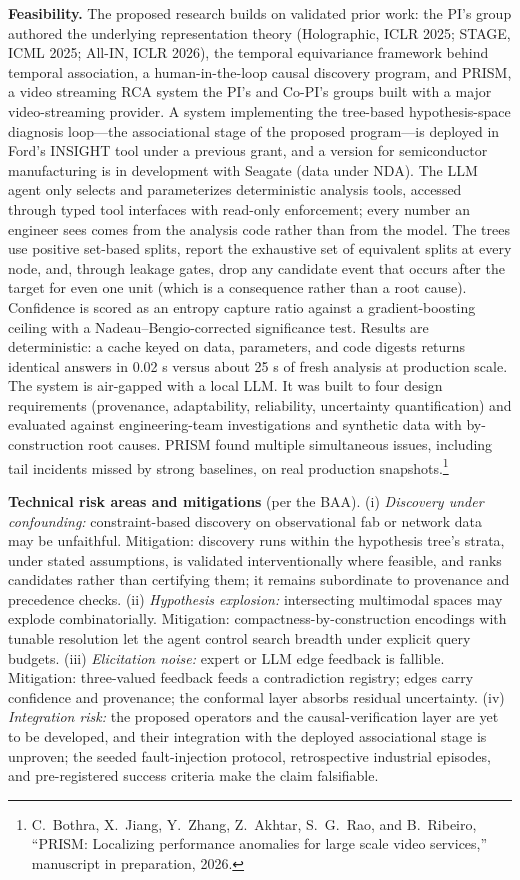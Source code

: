 \documentclass[12pt]{article}
\begin{document}
\textbf{Feasibility.} The proposed research builds on validated prior work: the PI's group authored the underlying representation theory (Holographic, ICLR 2025; STAGE, ICML 2025; All-IN, ICLR 2026), the temporal equivariance framework behind temporal association, a human-in-the-loop causal discovery program, and PRISM, a video streaming RCA system the PI's and Co-PI's groups built with a major video-streaming provider. A system implementing the tree-based hypothesis-space diagnosis loop---the associational stage of the proposed program---is deployed in Ford's INSIGHT tool under a previous grant, and a version for semiconductor manufacturing is in development with Seagate (data under NDA). The LLM agent only selects and parameterizes deterministic analysis tools, accessed through typed tool interfaces with read-only enforcement; every number an engineer sees comes from the analysis code rather than from the model. The trees use positive set-based splits, report the exhaustive set of equivalent splits at every node, and, through leakage gates, drop any candidate event that occurs after the target for even one unit (which is a consequence rather than a root cause). Confidence is scored as an entropy capture ratio against a gradient-boosting ceiling with a Nadeau--Bengio-corrected significance test. Results are deterministic: a cache keyed on data, parameters, and code digests returns identical answers in 0.02 s versus about 25 s of fresh analysis at production scale. The system is air-gapped with a local LLM. It was built to four design requirements (provenance, adaptability, reliability, uncertainty quantification) and evaluated against engineering-team investigations and synthetic data with by-construction root causes. PRISM found multiple simultaneous issues, including tail incidents missed by strong baselines, on real production snapshots.\footnote{C.~Bothra, X.~Jiang, Y.~Zhang, Z.~Akhtar, S.~G.~Rao, and B.~Ribeiro, ``PRISM: Localizing performance anomalies for large scale video services,'' manuscript in preparation, 2026.}

\textbf{Technical risk areas and mitigations} (per the BAA). (i) \emph{Discovery under confounding:} constraint-based discovery on observational fab or network data may be unfaithful. Mitigation: discovery runs within the hypothesis tree's strata, under stated assumptions, is validated interventionally where feasible, and ranks candidates rather than certifying them; it remains subordinate to provenance and precedence checks. (ii) \emph{Hypothesis explosion:} intersecting multimodal spaces may explode combinatorially. Mitigation: compactness-by-construction encodings with tunable resolution let the agent control search breadth under explicit query budgets. (iii) \emph{Elicitation noise:} expert or LLM edge feedback is fallible. Mitigation: three-valued feedback feeds a contradiction registry; edges carry confidence and provenance; the conformal layer absorbs residual uncertainty. (iv) \emph{Integration risk:} the proposed operators and the causal-verification layer are yet to be developed, and their integration with the deployed associational stage is unproven; the seeded fault-injection protocol, retrospective industrial episodes, and pre-registered success criteria make the claim falsifiable.
\end{document}
